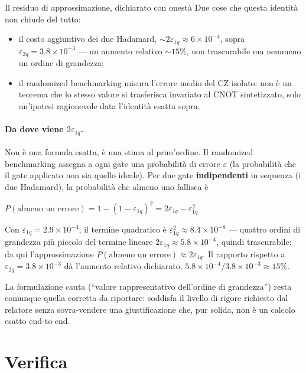 \documentclass[11pt,a4paper]{article}
\begin{document}
\begin{okbox}{Il residuo di approssimazione, dichiarato con onestà}
Due cose che questa identità non chiude del tutto:
\begin{itemize}[leftmargin=1.3em,itemsep=0.15em]
\item il costo aggiuntivo dei due Hadamard, $\sim2\varepsilon_{1q}\approx6\times10^{-4}$,
sopra $\varepsilon_{2q}=3.8\times10^{-3}$ --- un aumento relativo
$\sim15\%$, non trascurabile ma nemmeno un ordine di grandezza;
\item il randomized benchmarking misura l'errore medio del CZ isolato:
non è un teorema che lo stesso valore si trasferisca invariato al CNOT
sintetizzato, solo un'ipotesi ragionevole data l'identità esatta sopra.
\end{itemize}

\paragraph{Da dove viene $2\varepsilon_{1q}$.} Non è una formula esatta,
è una stima al prim'ordine. Il randomized benchmarking assegna a ogni
gate una probabilità di errore $\varepsilon$ (la probabilità che il gate
applicato non sia quello ideale). Per due gate \textbf{indipendenti} in
sequenza (i due Hadamard), la probabilità che almeno uno fallisca è
\begin{keyeq}
\centering
$P(\text{almeno un errore}) = 1-(1-\varepsilon_{1q})^2 = 2\varepsilon_{1q}-\varepsilon_{1q}^2$
\end{keyeq}
Con $\varepsilon_{1q}=2.9\times10^{-4}$, il termine quadratico è
$\varepsilon_{1q}^2\approx8.4\times10^{-8}$ --- quattro ordini di
grandezza più piccolo del termine lineare $2\varepsilon_{1q}\approx5.8\times10^{-4}$,
quindi trascurabile: da qui l'approssimazione
$P(\text{almeno un errore})\approx2\varepsilon_{1q}$. Il rapporto rispetto
a $\varepsilon_{2q}=3.8\times10^{-3}$ dà l'aumento relativo dichiarato,
$5.8\times10^{-4}/3.8\times10^{-3}\approx15\%$.
\end{okbox}
La formulazione cauta (``valore rappresentativo dell'ordine di
grandezza'') resta comunque quella corretta da riportare: soddisfa il
livello di rigore richiesto dal relatore senza sovra-vendere una
giustificazione che, pur solida, non è un calcolo esatto end-to-end.

\section{Verifica}
\end{document}
